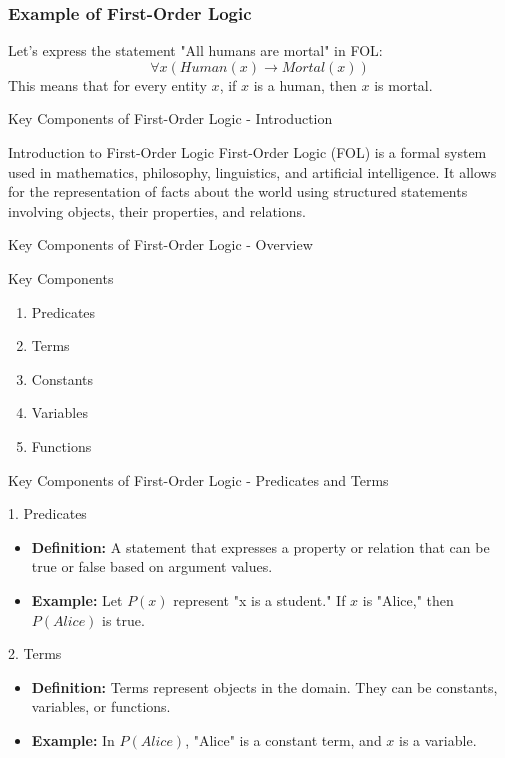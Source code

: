 \documentclass[aspectratio=169]{beamer}
\begin{document}
\begin{frame}[fragile]
    \frametitle{Example of First-Order Logic}
    Let's express the statement "All humans are mortal" in FOL:
    \begin{equation}
        \forall x (Human(x) \rightarrow Mortal(x))
    \end{equation}
    This means that for every entity $x$, if $x$ is a human, then $x$ is mortal.
\end{frame}

\begin{frame}[fragile]{Key Components of First-Order Logic - Introduction}
    \begin{block}{Introduction to First-Order Logic}
        First-Order Logic (FOL) is a formal system used in mathematics, philosophy, linguistics, and artificial intelligence. It allows for the representation of facts about the world using structured statements involving objects, their properties, and relations.
    \end{block}
\end{frame}

\begin{frame}[fragile]{Key Components of First-Order Logic - Overview}
    \begin{block}{Key Components}
        \begin{enumerate}
            \item Predicates
            \item Terms
            \item Constants
            \item Variables
            \item Functions
        \end{enumerate}
    \end{block}
\end{frame}

\begin{frame}[fragile]{Key Components of First-Order Logic - Predicates and Terms}
    \begin{block}{1. Predicates}
        \begin{itemize}
            \item \textbf{Definition:} A statement that expresses a property or relation that can be true or false based on argument values.
            \item \textbf{Example:} Let \( P(x) \) represent "x is a student." If \( x \) is "Alice," then \( P(Alice) \) is true.
        \end{itemize}
    \end{block}

    \begin{block}{2. Terms}
        \begin{itemize}
            \item \textbf{Definition:} Terms represent objects in the domain. They can be constants, variables, or functions.
            \item \textbf{Example:} In \( P(Alice) \), "Alice" is a constant term, and \( x \) is a variable.
        \end{itemize}
    \end{block}
\end{frame}
\end{document}
